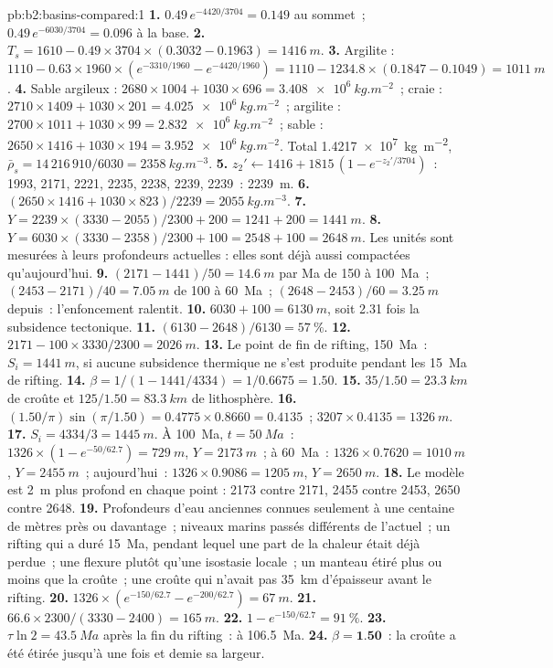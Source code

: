 \begin{solution}{pb:b2:basins-compared:1}
\textbf{1.} $0.49\,e^{-4420/3704} = 0.149$ au sommet~; $0.49\,e^{-6030/3704} = 0.096$ à la base.
\textbf{2.} $T_s = 1610 - 0.49\times3704\times(0.3032 - 0.1963) = \qty{1416}{m}$.
\textbf{3.} Argilite : $1110 - 0.63\times1960\times(e^{-3310/1960} - e^{-4420/1960}) = 1110 - 1234.8
\times(0.1847 - 0.1049) = \qty{1011}{m}$.
\textbf{4.} Sable argileux : $2680\times1004 + 1030\times696 = \qty{3.408e6}{kg.m^{-2}}$~; craie :
$2710\times1409 + 1030\times201 = \qty{4.025e6}{kg.m^{-2}}$~; argilite : $2700\times1011 + 1030\times99 =
\qty{2.832e6}{kg.m^{-2}}$~; sable : $2650\times1416 + 1030\times194 = \qty{3.952e6}{kg.m^{-2}}$. Total
\qty{1.4217e7}{kg.m^{-2}}, $\bar\rho_s = 14\,216\,910/6030 = \qty{2358}{kg.m^{-3}}$.
\textbf{5.} $z_2' \leftarrow 1416 + 1815\,(1 - e^{-z_2'/3704})$~: 1993, 2171, 2221, 2235, 2238, 2239,
2239~: \qty{2239}{m}.
\textbf{6.} $(2650\times1416 + 1030\times823)/2239 = \qty{2055}{kg.m^{-3}}$.
\textbf{7.} $Y = 2239\times(3330 - 2055)/2300 + 200 = 1241 + 200 = \qty{1441}{m}$.
\textbf{8.} $Y = 6030\times(3330 - 2358)/2300 + 100 = 2548 + 100 = \qty{2648}{m}$. Les unités sont
mesurées à leurs profondeurs actuelles : elles sont déjà aussi compactées qu'aujourd'hui.
\textbf{9.} $(2171 - 1441)/50 = \qty{14.6}{m}$ par Ma de 150 à \qty{100}{Ma}~;
$(2453 - 2171)/40 = \qty{7.05}{m}$ de 100 à \qty{60}{Ma}~; $(2648 - 2453)/60 = \qty{3.25}{m}$
depuis~: l'enfoncement ralentit.
\textbf{10.} $6030 + 100 = \qty{6130}{m}$, soit 2.31 fois la subsidence tectonique.
\textbf{11.} $(6130 - 2648)/6130 = \qty{57}{\percent}$.
\textbf{12.} $2171 - 100\times3330/2300 = \qty{2026}{m}$.
\textbf{13.} Le point de fin de rifting, \qty{150}{Ma}~: $S_i = \qty{1441}{m}$, si aucune subsidence thermique
ne s'est produite pendant les \qty{15}{Ma} de rifting.
\textbf{14.} $\beta = 1/(1 - 1441/4334) = 1/0.6675 = 1.50$.
\textbf{15.} $35/1.50 = \qty{23.3}{km}$ de croûte et $125/1.50 = \qty{83.3}{km}$ de lithosphère.
\textbf{16.} $(1.50/\pi)\sin(\pi/1.50) = 0.4775\times0.8660 = 0.4135$~; $3207\times0.4135 =
\qty{1326}{m}$.
\textbf{17.} $S_i = 4334/3 = \qty{1445}{m}$. À \qty{100}{Ma}, $t = \qty{50}{Ma}$~: $1326\times(1 -
e^{-50/62.7}) = \qty{729}{m}$, $Y = \qty{2173}{m}$~; à \qty{60}{Ma}~: $1326\times0.7620 =
\qty{1010}{m}$, $Y = \qty{2455}{m}$~; aujourd'hui~: $1326\times0.9086 = \qty{1205}{m}$, $Y = \qty{2650}{m}$.
\textbf{18.} Le modèle est \qty{2}{m} plus profond en chaque point : 2173 contre 2171, 2455 contre 2453,
2650 contre 2648.
\textbf{19.} Profondeurs d'eau anciennes connues seulement à une centaine de mètres près ou davantage~; niveaux marins passés
différents de l'actuel~; un rifting qui a duré \qty{15}{Ma}, pendant lequel une part de la chaleur était déjà
perdue~; une flexure plutôt qu'une isostasie locale~; un manteau étiré plus ou moins que la croûte~;
une croûte qui n'avait pas \qty{35}{km} d'épaisseur avant le rifting.
\textbf{20.} $1326\times(e^{-150/62.7} - e^{-200/62.7}) = \qty{67}{m}$.
\textbf{21.} $66.6\times2300/(3330 - 2400) = \qty{165}{m}$.
\textbf{22.} $1 - e^{-150/62.7} = \qty{91}{\percent}$.
\textbf{23.} $\tau\ln2 = \qty{43.5}{Ma}$ après la fin du rifting~: à \qty{106.5}{Ma}.
\textbf{24.} $\beta = \textbf{1.50}$~: la croûte a été étirée jusqu'à une fois et demie sa largeur.
\end{solution}
